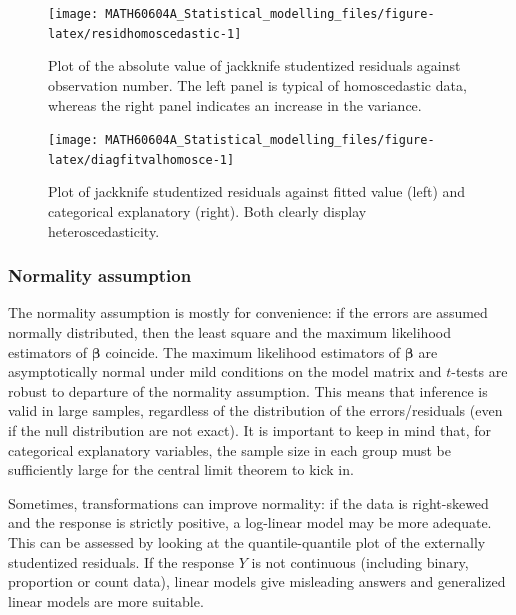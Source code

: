 \documentclass[
  11pt,
  letterpaper,
]{book}
\theoremstyle{definition}
\theoremstyle{definition}
\theoremstyle{definition}
\theoremstyle{remark}
\begin{document}
\begin{figure}

{\centering \texttt{[image: MATH60604A\_Statistical\_modelling\_files/figure-latex/residhomoscedastic-1]} 

}

\caption{Plot of the absolute value of jackknife studentized residuals against observation number. The left panel is typical of homoscedastic data, whereas the right panel indicates an increase in the variance.}\label{fig:residhomoscedastic}
\end{figure}

\begin{figure}

{\centering \texttt{[image: MATH60604A\_Statistical\_modelling\_files/figure-latex/diagfitvalhomosce-1]} 

}

\caption{Plot of jackknife studentized residuals against fitted value (left) and categorical explanatory (right). Both clearly display heteroscedasticity.}\label{fig:diagfitvalhomosce}
\end{figure}

\hypertarget{normality-assumption}{%
\subsubsection{Normality assumption}\label{normality-assumption}}

The normality assumption is mostly for convenience: if the errors are assumed normally distributed, then the least square and the maximum likelihood estimators of \(\boldsymbol{\beta}\) coincide.
The maximum likelihood estimators of \(\boldsymbol{\beta}\) are asymptotically normal under mild conditions on the model matrix and \(t\)-tests are robust to departure of the normality assumption. This means that inference is valid in large samples, regardless of the distribution of the errors/residuals (even if the null distribution are not exact). It is important to keep in mind that, for categorical explanatory variables, the sample size in each group must be sufficiently large for the central limit theorem to kick in.

Sometimes, transformations can improve normality: if the data is right-skewed and the response is strictly positive, a log-linear model may be more adequate. This can be assessed by looking at the quantile-quantile plot of the externally studentized residuals. If the response \(Y\) is not continuous (including binary, proportion or count data), linear models give misleading answers and generalized linear models are more suitable.
\end{document}
